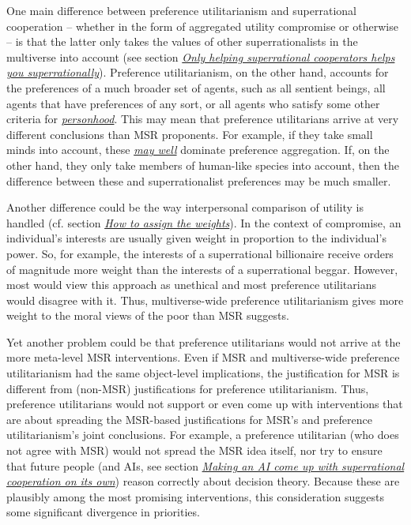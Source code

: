 One main difference between preference utilitarianism and superrational
cooperation -- whether in the form of aggregated utility compromise or
otherwise -- is that the latter only takes the values of other
superrationalists in the multiverse into account (see section
\protect\hyperlink{only-helping-superrational-cooperators-helps-you-superrationally}{\emph{Only
helping superrational cooperators helps you superrationally}}).
Preference utilitarianism, on the other hand, accounts for the
preferences of a much broader set of agents, such as all sentient
beings, all agents that have preferences of any sort, or all agents who
satisfy some other criteria for
\href{https://en.wikipedia.org/wiki/Personhood}{\emph{personhood}}. This
may mean that preference utilitarians arrive at very different
conclusions than MSR proponents. For example, if they take small minds
into account, these
\href{https://en.wikipedia.org/wiki/Biomass_(ecology)\#Global_biomass}{\emph{may
well}} dominate preference aggregation. If, on the other hand, they only
take members of human-like species into account, then the difference
between these and superrationalist preferences may be much smaller.

Another difference could be the way interpersonal comparison of utility
is handled (cf. section
\protect\hyperlink{how-to-assign-the-weights}{\emph{How to assign the
weights}}). In the context of compromise, an individual's interests
are usually given weight in proportion to the individual's power. So,
for example, the interests of a superrational billionaire receive orders
of magnitude more weight than the interests of a superrational beggar.
However, most would view this approach as unethical and most preference
utilitarians would disagree with it. Thus, multiverse-wide preference
utilitarianism gives more weight to the moral views of the poor than MSR
suggests.

Yet another problem could be that preference utilitarians would not
arrive at the more meta-level MSR interventions. Even if MSR and
multiverse-wide preference utilitarianism had the same object-level
implications, the justification for MSR is different from (non-MSR)
justifications for preference utilitarianism. Thus, preference
utilitarians would not support or even come up with interventions that
are about spreading the MSR-based justifications for MSR's and
preference utilitarianism's joint conclusions. For example, a preference
utilitarian (who does not agree with MSR) would not spread the MSR idea
itself, nor try to ensure that future people (and AIs, see section
\protect\hyperlink{making-an-ai-come-up-with-superrational-cooperation-on-its-own}{\emph{Making
an AI come up with superrational cooperation on its own}}) reason
correctly about decision theory. Because these are plausibly among the
most promising interventions, this consideration suggests some
significant divergence in priorities.

